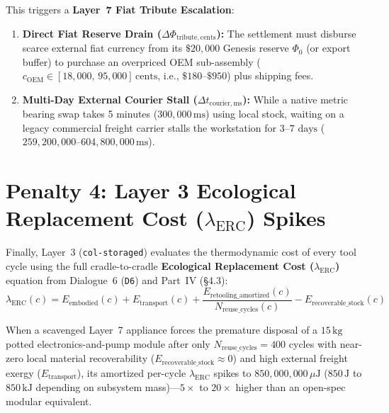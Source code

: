 This triggers a \textbf{Layer~7 Fiat Tribute Escalation}:
\begin{enumerate}
    \item \textbf{Direct Fiat Reserve Drain ($\Delta \Phi_{\mathrm{tribute,cents}}$):} The settlement must disburse scarce external fiat currency from its $\$20{,}000$ Genesis reserve $\Phi_0$ (or export buffer) to purchase an overpriced OEM sub-assembly ($c_{\mathrm{OEM}} \in [18{,}000,\, 95{,}000]\,\text{cents}$, i.e., $\$180\text{--}\$950$) plus shipping fees.
    \item \textbf{Multi-Day External Courier Stall ($\Delta t_{\mathrm{courier,ms}}$):} While a native metric bearing swap takes 5 minutes ($300{,}000\,\mathrm{ms}$) using local stock, waiting on a legacy commercial freight carrier stalls the workstation for $3\text{--}7\text{ days}$ ($259{,}200{,}000\text{--}604{,}800{,}000\,\mathrm{ms}$).
\end{enumerate}

\section{Penalty 4: Layer 3 Ecological Replacement Cost ($\lambda_{\mathrm{ERC}}$) Spikes}
\label{sec:l7-penalty-erc}

Finally, Layer~3 (\texttt{col-storaged}) evaluates the thermodynamic cost of every tool cycle using the full cradle-to-cradle \textbf{Ecological Replacement Cost ($\lambda_{\mathrm{ERC}}$)} equation from Dialogue~6 (\texttt{D6}) and Part~IV (\S 4.3):
\begin{equation}
\lambda_{\mathrm{ERC}}(c) = E_{\mathrm{embodied}}(c) + E_{\mathrm{transport}}(c) + \frac{E_{\mathrm{retooling\_amortized}}(c)}{N_{\mathrm{reuse\_cycles}}(c)} - E_{\mathrm{recoverable\_stock}}(c)
\label{eq:ch2-erc-formula}
\end{equation}

When a scavenged Layer~7 appliance forces the premature disposal of a $15\,\mathrm{kg}$ potted electronics-and-pump module after only $N_{\mathrm{reuse\_cycles}} = 400$ cycles with near-zero local material recoverability ($E_{\mathrm{recoverable\_stock}} \approx 0$) and high external freight exergy ($E_{\mathrm{transport}}$), its amortized per-cycle $\lambda_{\mathrm{ERC}}$ spikes to $850{,}000{,}000\,\mu\mathrm{J}$ ($850\,\mathrm{J}$ to $850\,\mathrm{kJ}$ depending on subsystem mass)---$5\times$ to $20\times$ higher than an open-spec modular equivalent.

